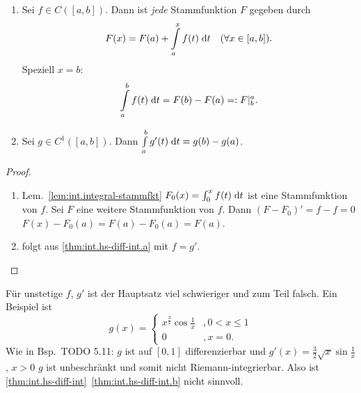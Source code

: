 \documentclass[12pt]{scrreprt}
\begin{document}
\begin{thm}
  \label{thm:int.hs-diff-int}
  \begin{enumerate}
    \item \label{thm:int.hs-diff-int.a} Sei $f\in C([a,b])$. Dann ist
      \emph{jede} Stammfunktion $F$ gegeben durch
      \[F(x)=F(a)+\int\limits_{a}^{x}{f(t)}\;\mathrm{d}t \quad (\forall
      x\in[a,b]).\]
      Speziell $x=b$: \[\int\limits_{a}^{b}{f(t)}\;\mathrm{d}t=F(b)-F(a)=:F|_b^a.\]
    \item \label{thm:int.hs-diff-int.b} Sei $g\in C^1([a,b])$. Dann $\int\limits_{a}^{b}{g'(t)}\;\mathrm{d}t=g(b)-g(a)$.
  \end{enumerate}
\end{thm}
\begin{proof}
  \begin{enumerate}
  \item Lem.~\ref{lem:int.integral-stammfkt} \folgt
    $F_0(x)=\int_{0}^{x}{f(t)}\;\mathrm{d}t$ ist eine Stammfunktion von
    $f$. Sei $F$ eine weitere Stammfunktion von $f$. Dann
    $(F-F_0)'=f-f=0$ 
    $F(x)-F_0(a)=F(a)-F_0(a)=F(a)$.
  \item folgt aus \ref{thm:int.hs-diff-int.a} mit $f=g'$.
  \end{enumerate}
\end{proof}

\begin{bem*}
  Für unstetige $f$, $g'$ ist der Hauptsatz viel schwieriger und zum
  Teil falsch. Ein Beispiel ist
  \[g(x)=\begin{cases}x^{\frac32}\cos{\frac1x} &, 0<x\le1\\
    0 &, x=0.\end{cases}\]
  Wie in Bsp.~TODO 5.11: $g$ ist auf $[0,1]$ differenzierbar und
  $g'(x)=\frac32\sqrt{x}\sin{\frac1x}$, $x>0$ \folgt $g$ ist
  unbeschränkt und somit nicht Riemann-integrierbar. Also ist
  \ref{thm:int.hs-diff-int}~\ref{thm:int.hs-diff-int.b} nicht
  sinnvoll.
\end{bem*}
\end{document}
